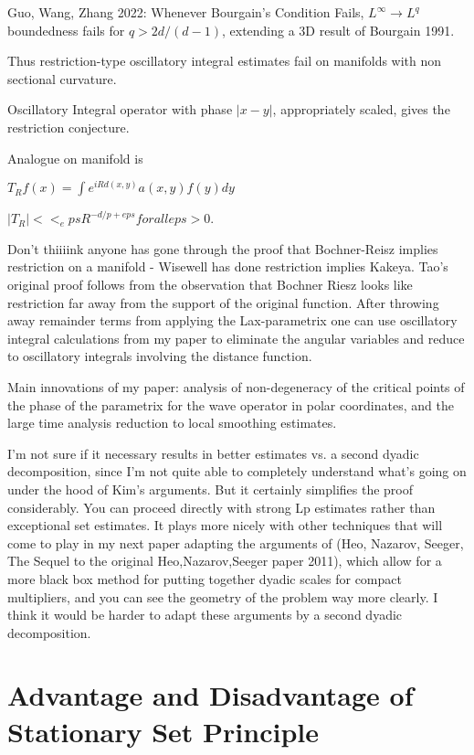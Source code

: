 \documentclass[11pt]{article}
\begin{document}
Guo, Wang, Zhang 2022: Whenever Bourgain's Condition Fails, $L^\infty \to L^q$ boundedness fails for $q > 2d/(d-1)$, extending a 3D result of Bourgain 1991.

    Thus restriction-type oscillatory integral estimates fail on manifolds with non sectional curvature.

        Oscillatory Integral operator with phase $|x - y|$, appropriately scaled, gives the restriction conjecture.

        Analogue on manifold is

                $T_R f(x) = \int e^{i R d(x,y)} a(x,y) f(y) dy$

                $|T_R| <<_eps R^{-d/p + eps} for all eps > 0$.

            Don't thiiiink anyone has gone through the proof that Bochner-Reisz implies restriction on a manifold - Wisewell has done restriction implies Kakeya. Tao's original proof follows from the observation that Bochner Riesz looks like restriction far away from the support of the original function. After throwing away remainder terms from applying the Lax-parametrix one can use oscillatory integral calculations from my paper to eliminate the angular variables and reduce to oscillatory integrals involving the distance function.

    Main innovations of my paper: analysis of non-degeneracy of the critical points of the phase of the parametrix for the wave operator in polar coordinates, and the large time analysis reduction to local smoothing estimates.

    I'm not sure if it necessary results in better estimates vs. a second dyadic decomposition, since I'm not quite able to completely understand what's going on under the hood of Kim's arguments. But it certainly simplifies the proof considerably. You can proceed directly with strong Lp estimates rather than exceptional set estimates. It plays more nicely with other techniques that will come to play in my next paper adapting the arguments of (Heo, Nazarov, Seeger, The Sequel to the original Heo,Nazarov,Seeger paper 2011), which allow for a more black box method for putting together dyadic scales for compact multipliers, and you can see the geometry of the problem way more clearly. I think it would be harder to adapt these arguments by a second dyadic decomposition.

\section{Advantage and Disadvantage of Stationary Set Principle}
\end{document}
